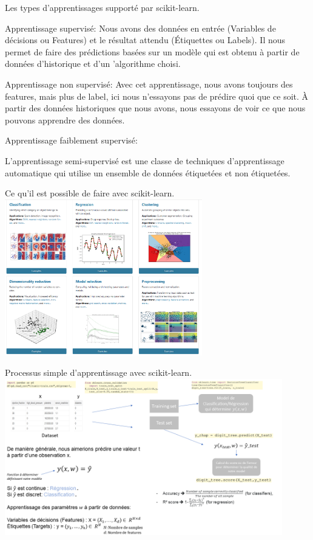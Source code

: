 \documentclass[9pt]{beamer}
\begin{document}
\begin{frame}{Les types d'apprentissages supporté par scikit-learn.}
\begin{itemize}
\begin{block}{Apprentissage supervisé:}
Nous avons des données en entrée (Variables de décisions ou Features) et le résultat attendu (\'Etiquettes ou Labels). Il nous permet de faire des prédictions basées sur un modèle qui est obtenu à partir de données d’historique et d'un ’algorithme choisi.
\end{block}
\begin{block}{Apprentissage non supervisé:}
Avec cet apprentissage, nous avons toujours des features, mais plus de label, ici nous n’essayons pas de prédire quoi que ce soit. À partir des données historiques que nous avons, nous essayons de voir ce que nous pouvons apprendre des données.
\end{block}
\begin{block}{Apprentissage faiblement supervisé:}

L'apprentissage semi-supervisé est une classe de techniques d'apprentissage automatique qui utilise un ensemble de données étiquetées et non étiquetées.
\end{block}

\end{itemize}

\end{frame}


\begin{frame}{Ce qu'il est possible de faire avec scikit-learn.}
 \includegraphics[height=6.8cm]{scikitlearnoverview.PNG}
\centering   
\end{frame}



\begin{frame}{Processus simple d'apprentissage avec scikit-learn.}
\includegraphics[height=6.8cm]{Diapositive1.PNG}
\centering   
\end{frame}
\end{document}

